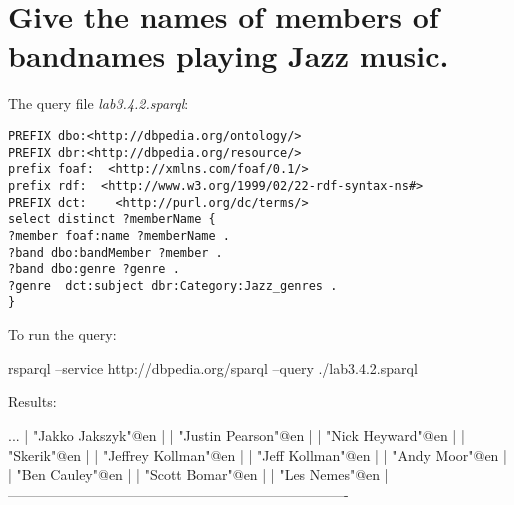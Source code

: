 \documentclass[a4paper, 12pt]{report}
\begin{document}
\section{Give the names of members of bandnames playing Jazz music.}
The query file \emph{lab3.4.2.sparql}:
\begin{lstlisting}[frame=single]
PREFIX dbo:<http://dbpedia.org/ontology/>
PREFIX dbr:<http://dbpedia.org/resource/>
prefix foaf:  <http://xmlns.com/foaf/0.1/>
prefix rdf:  <http://www.w3.org/1999/02/22-rdf-syntax-ns#>
PREFIX dct:    <http://purl.org/dc/terms/>
select distinct ?memberName {
?member foaf:name ?memberName .
?band dbo:bandMember ?member .
?band dbo:genre ?genre .
?genre  dct:subject dbr:Category:Jazz_genres .
}
\end{lstlisting}
To run the query:
\begin{commandshell}
    rsparql --service http://dbpedia.org/sparql --query ./lab3.4.2.sparql
\end{commandshell}
Results:
\begin{messageshell}
...
| "Jakko Jakszyk"@en                                                    |
| "Justin Pearson"@en                                                   |
| "Nick Heyward"@en                                                     |
| "Skerik"@en                                                           |
| "Jeffrey Kollman"@en                                                  |
| "Jeff Kollman"@en                                                     |
| "Andy Moor"@en                                                        |
| "Ben Cauley"@en                                                       |
| "Scott Bomar"@en                                                      |
| "Les Nemes"@en                                                        |
-------------------------------------------------------------------------
\end{messageshell}
\end{document}
